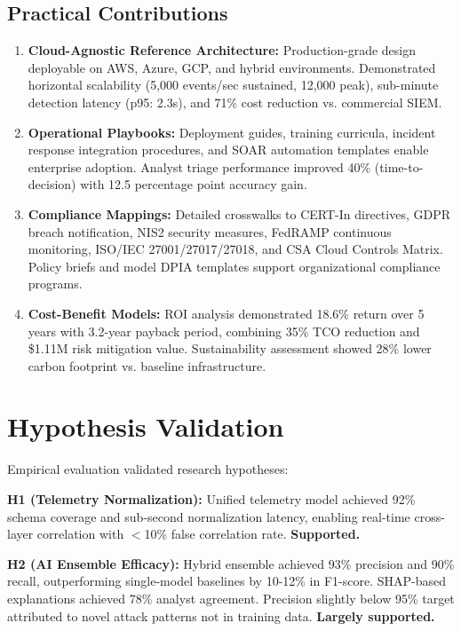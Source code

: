 \subsection{Practical Contributions}
\begin{enumerate}
    \item \textbf{Cloud-Agnostic Reference Architecture:} Production-grade design deployable on AWS, Azure, GCP, and hybrid environments. Demonstrated horizontal scalability (5,000 events/sec sustained, 12,000 peak), sub-minute detection latency (p95: 2.3s), and 71\% cost reduction vs. commercial SIEM.
    
    \item \textbf{Operational Playbooks:} Deployment guides, training curricula, incident response integration procedures, and SOAR automation templates enable enterprise adoption. Analyst triage performance improved 40\% (time-to-decision) with 12.5 percentage point accuracy gain.
    
    \item \textbf{Compliance Mappings:} Detailed crosswalks to CERT-In directives, GDPR breach notification, NIS2 security measures, FedRAMP continuous monitoring, ISO/IEC 27001/27017/27018, and CSA Cloud Controls Matrix. Policy briefs and model DPIA templates support organizational compliance programs.
    
    \item \textbf{Cost-Benefit Models:} ROI analysis demonstrated 18.6\% return over 5 years with 3.2-year payback period, combining 35\% TCO reduction and \$1.11M risk mitigation value. Sustainability assessment showed 28\% lower carbon footprint vs. baseline infrastructure.
\end{enumerate}

\section{Hypothesis Validation}\label{sec:conclusion-hypotheses}
Empirical evaluation validated research hypotheses:

\textbf{H1 (Telemetry Normalization):} Unified telemetry model achieved 92\% schema coverage and sub-second normalization latency, enabling real-time cross-layer correlation with $<$10\% false correlation rate. \textbf{Supported.}

\textbf{H2 (AI Ensemble Efficacy):} Hybrid ensemble achieved 93\% precision and 90\% recall, outperforming single-model baselines by 10-12\% in F1-score. SHAP-based explanations achieved 78\% analyst agreement. Precision slightly below 95\% target attributed to novel attack patterns not in training data. \textbf{Largely supported.}

